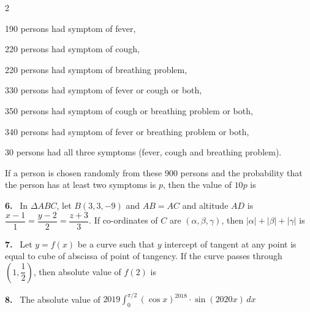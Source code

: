 \documentclass[10pt]{extarticle}
\newcommand{\qn}[1]{\par\smallskip\noindent\textbf{#1.}~}
\begin{document}
\begin{multicols}{2}
\par\noindent\hspace{1em}190 persons had symptom of fever,\par\noindent\hspace{1em}220 persons had symptom of cough,\par\noindent\hspace{1em}220 persons had symptom of breathing problem,\par\noindent\hspace{1em}330 persons had symptom of fever or cough or both,\par\noindent\hspace{1em}350 persons had symptom of cough or breathing problem or both,\par\noindent\hspace{1em}340 persons had symptom of fever or breathing problem or both,\par\noindent\hspace{1em}30 persons had all three symptoms (fever, cough and breathing problem).\par
If a person is chosen randomly from these 900 persons and the probability that the person has at least two symptoms is $p$, then the value of $10p$ is
\qn{6} In $\Delta ABC$, let $B(3,3,-9)$ and $AB=AC$ and altitude $AD$ is $\dfrac{x-1}1=\dfrac{y-2}2=\dfrac{z+3}3$. If co-ordinates of $C$ are $(\alpha,\beta,\gamma)$, then $|\alpha|+|\beta|+|\gamma|$ is
\qn{7} Let $y=f(x)$ be a curve such that $y$ intercept of tangent at any point is equal to cube of abscissa of point of tangency. If the curve passes through $\left(1,\dfrac12\right)$, then absolute value of $f(2)$ is
\qn{8} The absolute value of $2019\displaystyle\int_0^{\pi/2}(\cos x)^{2018}\cdot\sin(2020x)\,dx$
\end{multicols}
\end{document}
